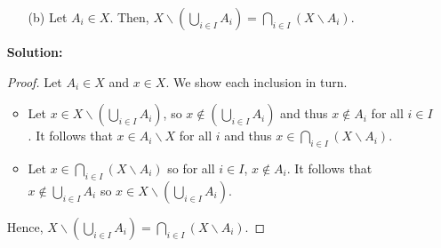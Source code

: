 \documentclass[letterpaper,12pt]{article}
\theoremstyle{definition}
\begin{document}
\begin{enumerate}
    \item[] \begin{enumerate}
        \item[(b)] Let $A_i \in X$. Then, $X \backslash (\bigcup_{i \in I} A_i)   = \bigcap_{i \in I} (X \backslash A_i )$.
    \end{enumerate}
     \begin{mdframed}
            \textbf{Solution:}
            \begin{proof}
                Let $A_i \in X$ and $x \in X$. We show each inclusion in turn.
                \begin{itemize}
                    \item Let $x \in X \backslash (\bigcup_{i \in I} A_i)$, so $x \notin (\bigcup_{i \in I} A_i)$ and thus $x \notin A_i$ for all $i \in I$. It follows that $x \in A_i \backslash X$ for all $i$ and thus $x \in  \bigcap_{i \in I} (X \backslash A_i)$.
                    \item Let $x \in  \bigcap_{i \in I} (X \backslash A_i)$ so for all $i \in I$, $x \notin A_i$. It follows that $x \notin \bigcup_{i \in I} A_i$ so $x \in X \backslash (\bigcup_{i \in I} A_i)$.
                \end{itemize}
                Hence, $X \backslash (\bigcup_{i \in I} A_i)   = \bigcap_{i \in I} (X \backslash A_i )$.
            \end{proof}
        \end{mdframed}
\end{enumerate}
\pagebreak
\end{document}
